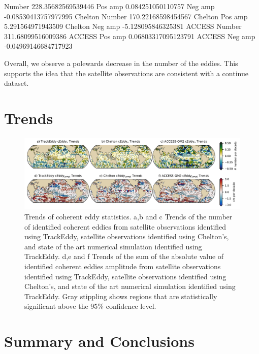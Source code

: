 \documentclass[draft,linenumbers]{agujournal2019}
\begin{document}
	Number 228.35682569539446
	Pos amp 0.084251050110757
	Neg amp -0.08530413757977995
	Chelton Number 170.22168598454567
	Chelton Pos amp 5.291564971943509
	Chelton Neg amp -5.128095846325381
	ACCESS Number 311.68099516009386
	ACCESS Pos amp 0.06803317095123791
	ACCESS Neg amp -0.04969146684717923


	Overall, we observe a polewards decrease in the number of the eddies. This supports the idea that the satellite observations are consistent with a continue dataset.




	\section{Trends}

	\begin{figure}
	    \centering
	    \includegraphics[width=1\textwidth]{figures/all_trackeddy_trends.pdf}
	    \caption{Trends of coherent eddy statistics. a,b and c Trends of the number of identified coherent eddies from satellite observations identified using TrackEddy, satellite observations identified using Chelton's, and state of the art numerical simulation identified using TrackEddy. d,e and f Trends of the sum of the absolute value of identified coherent eddies amplitude from satellite observations identified using TrackEddy, satellite observations identified using Chelton's, and state of the art numerical simulation identified using TrackEddy. Gray stippling shows regions that are statistically significant above the 95\% confidence level.
		}
	    \label{fig:eddy_stats_trends}
	\end{figure}
	
	\section{Summary and Conclusions}	
	
	\acknowledgments
	
	
	
\end{document}
